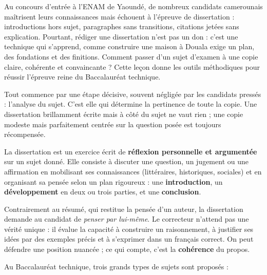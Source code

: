\documentclass[11pt]{article}
\newcommand{\cle}[1]{{\popxbold\color{popdark}#1}}
\newcounter{popsec}
\newcounter{popsub}
\newcommand{\courssub}[1]{%
  \stepcounter{popsub}%
  \par\vspace{9pt}\noindent{\popxbold\fontsize{11.5}{13}\selectfont\color{popink}{\color{poporange}\thepopsec.\thepopsub}\hspace{6pt}#1}\par\nopagebreak\vspace{4pt}
}
\begin{document}
Au concours d'entrée à l'ENAM de Yaoundé, de nombreux candidats camerounais maîtrisent leurs connaissances mais échouent à l'épreuve de dissertation : introductions hors sujet, paragraphes sans transitions, citations jetées sans explication. Pourtant, rédiger une dissertation n'est pas un don : c'est une technique qui s'apprend, comme construire une maison à Douala exige un plan, des fondations et des finitions. Comment passer d'un sujet d'examen à une copie claire, cohérente et convaincante ? Cette leçon donne les outils méthodiques pour réussir l'épreuve reine du Baccalauréat technique.

Tout commence par une étape décisive, souvent négligée par les candidats pressés : \cle{l'analyse du sujet}. C'est elle qui détermine la pertinence de toute la copie. Une dissertation brillamment écrite mais à côté du sujet ne vaut rien ; une copie modeste mais parfaitement centrée sur la question posée est toujours récompensée.

\courssub{Qu'est-ce qu'une dissertation ?}

\begin{definition}[La dissertation]
La \cle{dissertation} est un exercice écrit de \textbf{réflexion personnelle et argumentée} sur un sujet donné. Elle consiste à discuter une question, un jugement ou une affirmation en mobilisant ses connaissances (littéraires, historiques, sociales) et en organisant sa pensée selon un plan rigoureux : une \textbf{introduction}, un \textbf{développement} en deux ou trois parties, et une \textbf{conclusion}.
\end{definition}

Contrairement au résumé, qui restitue la pensée d'un auteur, la dissertation demande au candidat de \emph{penser par lui-même}. Le correcteur n'attend pas une vérité unique : il évalue la capacité à construire un raisonnement, à justifier ses idées par des exemples précis et à s'exprimer dans un français correct. On peut défendre une position nuancée ; ce qui compte, c'est la \textbf{cohérence} du propos.

Au Baccalauréat technique, trois grands types de sujets sont proposés :
\end{document}
